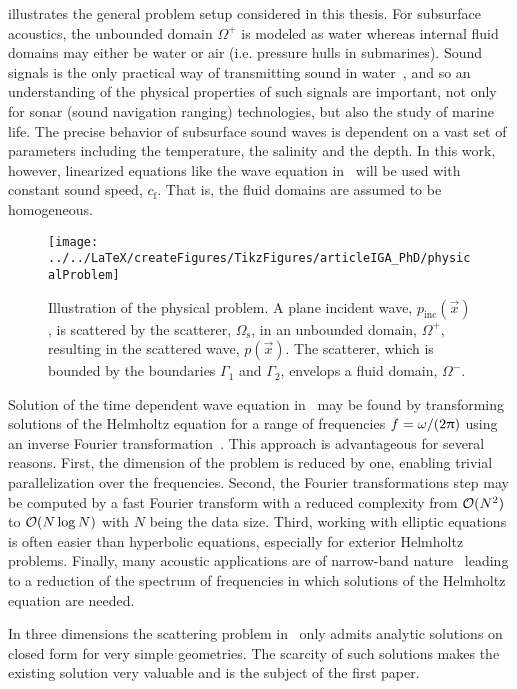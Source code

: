  illustrates the general problem setup considered in this thesis. For subsurface acoustics, the unbounded domain $\Omega^+$ is modeled as water whereas internal fluid domains may either be water or air (i.e. pressure hulls in submarines). Sound signals is the only practical way of transmitting sound in water~\cite{Jensen2011coa}, and so an understanding of the physical properties of such signals are important, not only for sonar (sound navigation ranging) technologies, but also the study of marine life. The precise behavior of subsurface sound waves is dependent on a vast set of parameters including the temperature, the salinity and the depth. In this work, however, linearized equations like the wave equation in~ will be used with constant sound speed, $c_{\mathrm{f}}$. That is, the fluid domains are assumed to be homogeneous.
\begin{figure}
	\centering
	\texttt{[image: ../../LaTeX/createFigures/TikzFigures/articleIGA\_PhD/physicalProblem]}
	\caption{Illustration of the physical problem. A plane incident wave, $p_{\mathrm{inc}}(\vec{x})$, is scattered by the scatterer, $\Omega_{\mathrm{s}}$, in an unbounded domain, $\Omega^+$, resulting in the scattered wave, $p(\vec{x})$. The scatterer, which is bounded by the boundaries $\Gamma_1$ and $\Gamma_2$, envelops a fluid domain, $\Omega^-$.}
	\label{Fig:physicalProblem}
\end{figure}

Solution of the time dependent wave equation in~ may be found by transforming solutions of the Helmholtz equation for a range of frequencies ${f=\omega/(2\uppi)}$ using an inverse Fourier transformation~\cite{Jensen2011coa}. This approach is advantageous for several reasons. First, the dimension of the problem is reduced by one, enabling trivial parallelization over the frequencies. Second, the Fourier transformations step may be computed by a fast Fourier transform with a reduced complexity from $\mathcal{O}(N^2)$ to $\mathcal{O}(N\log N)$ with $N$ being the data size. Third, working with elliptic equations is often easier than hyperbolic equations, especially for exterior Helmholtz problems. Finally, many acoustic applications are of narrow-band nature~\cite{Jensen2011coa} leading to a reduction of the spectrum of frequencies in which solutions of the Helmholtz equation are needed.

In three dimensions the scattering problem in~ only admits analytic solutions on closed form for very simple geometries. The scarcity of such solutions makes the existing solution very valuable and is the subject of the first paper. 

